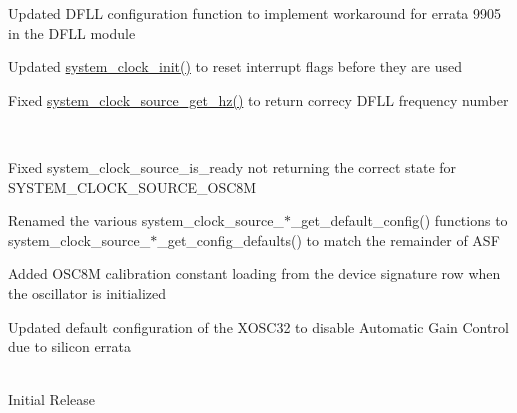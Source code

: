 \begin{longtabu}
\begin{DoxyItemize}
\item Updated D\+F\+LL configuration function to implement workaround for errata 9905 in the D\+F\+LL module \item Updated {\ttfamily \mbox{\hyperlink{group__asfdoc__sam0__system__clock__group_ga128236c1939f726786521434d8488b37}{system\+\_\+clock\+\_\+init()}}} to reset interrupt flags before they are used \item Fixed {\ttfamily \mbox{\hyperlink{group__asfdoc__sam0__system__clock__group_ga1894d901b7ed10e4c1e52a784c8962be}{system\+\_\+clock\+\_\+source\+\_\+get\+\_\+hz()}}} to return correcy D\+F\+LL frequency number   \end{DoxyItemize}
\\
\begin{DoxyItemize}
\item Fixed {\ttfamily system\+\_\+clock\+\_\+source\+\_\+is\+\_\+ready} not returning the correct state for {\ttfamily S\+Y\+S\+T\+E\+M\+\_\+\+C\+L\+O\+C\+K\+\_\+\+S\+O\+U\+R\+C\+E\+\_\+\+O\+S\+C8M} \item Renamed the various {\ttfamily system\+\_\+clock\+\_\+source\+\_\+$\ast$\+\_\+get\+\_\+default\+\_\+config}() functions to {\ttfamily system\+\_\+clock\+\_\+source\+\_\+$\ast$\+\_\+get\+\_\+config\+\_\+defaults}() to match the remainder of A\+SF \item Added O\+S\+C8M calibration constant loading from the device signature row when the oscillator is initialized \item Updated default configuration of the X\+O\+S\+C32 to disable Automatic Gain Control due to silicon errata   \end{DoxyItemize}
\\
Initial Release  \\
\end{longtabu}
